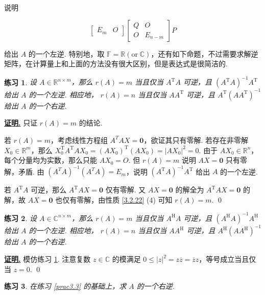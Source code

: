 \documentclass[10pt,openany]{article}
\theoremstyle{thmstyle} %
\newtheorem{practice}{练习}[section]
\theoremstyle{defstyle} %
\theoremstyle{prostyle} %
\theoremstyle{exastyle}
\theoremstyle{remstyle}
\renewenvironment{proof}[1][证明]{\par\underline{\textbf{#1.}} \;\fangsong}{\qed\par}
\newcommand{\T}{^{\text{T}}}
\newcommand{\Her}{^{\text{H}}}
\newcommand{\F}{\mathbb{F}}
\newcommand{\C}{\mathbb{C}}
\newcommand{\R}{\mathbb{R}}
\newcommand{\nm}{^{n \times m}}
\begin{document}
说明

\[ \begin{bmatrix}
	E_m & O
\end{bmatrix}\begin{bmatrix}
	Q & O \\
	O & E_{n-m}
\end{bmatrix}P \]


给出 \( A \) 的一个左逆. 特别地，取 \( \F=\R ( \text{or} \; \C) \)，还有如下命题，不过需要求解逆矩阵，在计算量上和上面的方法没有很大区别，但是表达式是很简洁的.

\begin{practice} \label{prac3.13}
	设 \( A \in \R\nm \)，那么 \( r(A)=m \) 当且仅当 \( A\T A \) 可逆，且 \( (A\T A)^{-1} A\T \) 给出 \( A \) 的一个左逆. 相应地， \( r(A)=n \) 当且仅当 \( AA\T  \) 可逆，且 \( A\T(AA\T)^{-1}  \) 给出 \( A \) 的一个右逆.
\end{practice} 

\begin{proof}
	只证 \( r(A)=m \) 的结论. 
	
	若 \( r(A)=m \)，考虑线性方程组 \( A^TAX=\bm{0} \)，欲证其只有零解. 若存在非零解 \( X_0 \in \R^m \)，那么 \( X_0\T A\T AX_0= (AX_0)\T (AX_0)=|AX_0|^2=0 \). {\color{red} 由于 \( AX_0 \in \R^n \)，每个分量均为实数，}那么只能 \( AX_0=O \). 但 \( r(A)=m \) 说明 \( AX=\bm{0} \) 只有零解，矛盾. 由 \( (A^TA)^{-1}(A^TA)=E_m \)，说明 \( (A\T A)^{-1} A\T \) 给出 \( A \) 的一个左逆. 
	
	若 \( A\T A \) 可逆，那么 \( A\T AX=\bm{0} \) 仅有零解. 又 \( AX=\bm{0} \) 的解全为 \( A\T AX=\bm{0} \) 的解，故 \( AX=\bm{0} \) 也仅有零解，由性质 \ref{3.2.22} (4) 可知 \( r(A)=m \).
\end{proof}

\begin{practice} 
	设 \( A \in \C\nm \)，那么 \( r(A)=m \) 当且仅当 \( A\Her A \) 可逆，且 \( (A\Her A)^{-1} A\Her \) 给出 \( A \) 的一个左逆. 相应地， \( r(A)=n \) 当且仅当 \( AA\Her  \) 可逆，且 \( A\Her(AA\Her)^{-1}  \) 给出 \( A \) 的一个右逆.
\end{practice} 

\begin{proof}
	模仿练习 \ref{prac3.13}. 注意复数 \( z \in \C \) 的模满足 \( 0 \leq |z|^2=z\overline{z}=\overline{z}z  \)，等号成立当且仅当 \( z=0 \).
\end{proof}

\begin{practice}
	在练习 \ref{prac3.3} 的基础上，求 \( A \) 的一个右逆.
\end{practice}
\end{document}
